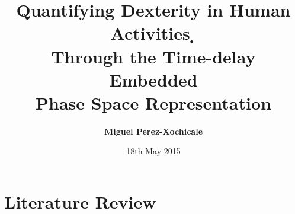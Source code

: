 \documentclass{beamer}
\title[Quantifying Dexterity in Human Activities ̣Through the Time-delay Embedded  Phase Space Representation]
{Quantifying Dexterity in Human Activities ̣\\ Through the Time-delay Embedded \\ Phase Space Representation}
\author[Miguel Perez-Xochicale]
{   %
    \textbf{Miguel Perez-Xochicale}
}
\institute[CVC-IIIA]
{   %

      \vspace{5mm}
    \begin{tabular}{c}
    \end{tabular}
}
\date[DEMO-2013]
{   %
     18th May 2015
}
\begin{document}
\frame{\titlepage}





\section{Literature Review}








% 
% 
% 
% 
\end{document}
